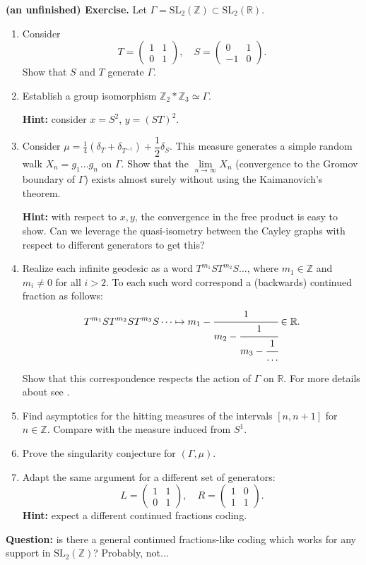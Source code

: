 \documentclass[11pt]{amsart}
\theoremstyle{definition}
\begin{document}
	\textbf{(an unfinished) Exercise.} Let $\Gamma = \text{SL}_2(\mathbb{Z}) \subset \text{SL}_2(\mathbb{R})$. 
	\begin{enumerate}
		\item Consider 
		\[
		T = \begin{pmatrix} 1 & 1 \\ 0 & 1 \end{pmatrix}, \quad S = \begin{pmatrix} 0 & 1 \\ -1 & 0 \end{pmatrix}.
		\]
		Show that $S$ and $T$ generate $\Gamma$.
		\item Establish a group isomorphism $\mathbb{Z}_2 * \mathbb{Z}_3 \simeq \Gamma$.
		
		\textbf{Hint:} consider $x = S^2$, $y = (ST)^2$. 
		\item Consider $\mu = \frac{1}{4} (\delta_T + \delta_{T^{-1}}) + \dfrac{1}{2} \delta_S$. This measure generates a simple random walk $X_n = g_1 \dots g_n$ on $\Gamma$. Show that the $\lim\limits_{n \rightarrow \infty} X_n$ (convergence to the Gromov boundary of $\Gamma$) exists almost surely without using the Kaimanovich's theorem.
		
		\textbf{Hint:} with respect to $x, y$, the convergence in the free product is easy to show. Can we leverage the quasi-isometry between the Cayley graphs with respect to different generators to get this? 
		\item Realize each infinite geodesic as a word $T^{m_1} S T^{m_2} S \dots$, where $m_1 \in \mathbb{Z}$ and $m_i \ne 0$ for all $i > 2$. To each such word correspond a (backwards) continued fraction as follows:
		\[
		T^{m_1} S T^{m_2} S T^{m_3} S \dots \mapsto m_1 - \cfrac{1}{m_2 - \cfrac{1}{m_3 - \cfrac{1}{\dots}}} \in \mathbb{R}.
		\]
		
		Show that this correspondence respects the action of $\Gamma$ on $\mathbb{R}$. For more details about see \cite{series}.
		
		\item Find asymptotics for the hitting measures of the intervals $[n, n+1]$ for $n \in \mathbb{Z}$. Compare with the measure induced from $S^1$.
		\item Prove the singularity conjecture for $(\Gamma, \mu)$.
		\item Adapt the same argument for a different set of generators:
		\[
		L = \begin{pmatrix} 1 & 1 \\ 0 & 1 \end{pmatrix}, \quad R = \begin{pmatrix} 1 & 0 \\ 1 & 1 \end{pmatrix}.
		\]
		\textbf{Hint:} expect a different continued fractions coding.
	\end{enumerate}
	\textbf{Question:} is there a general continued fractions-like coding which works for any support in $\text{SL}_2(\mathbb{Z})$? Probably, not...
	
\end{document}

